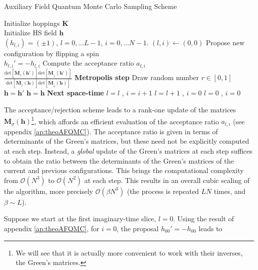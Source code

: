 \begin{algorithm}
\caption{Auxiliary Field Quantum Monte Carlo Sampling Scheme}
\label{afqmcSampling}
\begin{algorithmic}[5]
  \STATE Initialize hoppings $\bm K$  \\
  \STATE Initialize HS field $\bm h$  \\
  \STATE  $(h_{l, i}) = (\pm 1)$, $ l=0,... L-1$, $i = 0, ... N-1$.
  \STATE $(l, i) \leftarrow (0, 0)$
  \STATE \footnotesize{Propose new configuration by flipping a spin} \\ \normalsize{$h_{l, i}' = - h_{l, i}$} 
  \STATE \footnotesize{Compute the acceptance ratio $a_{l, i}$} \\
  \normalsize{$\frac{\text{det}[\bm M_\uparrow (\bm h')]\text{det}[\bm M_\downarrow (\bm h')]}{\text{det}[\bm M_\uparrow (\bm h)]\text{det}[\bm M_\downarrow (\bm h)]}$}
  \STATE \textbf{\normalsize{Metropolis step}}
  \STATE \footnotesize{Draw random number $r \in [0,1]$}
  \STATE $\bm h = \bm h'$
  \ELSE
  \STATE $\bm h = \bm h$
  \ENDIF
  \STATE \textbf{Next space-time }
  \STATE $l = l$ , $i = i +1 $
  \ELSE
  \STATE $l = l+1$ , $i = 0 $
  \ENDIF
  \STATE $l = 0$ , $i=0$
  \ENDIF
  \ENDIF
  \ENDFOR
\end{algorithmic}
\end{algorithm}

The acceptance/rejection scheme leads to a rank-one update of the matrices $\bm M_\sigma (\bm h)$\footnote{We will see that it is actually more convenient to work with their inverses, the Green's matrices.}, which affords an efficient evaluation of the acceptance ratio $a_{l, i}$ \cite{hou_numerical_2009} (see appendix \ref{ap:theoAFQMC}).
The acceptance ratio is given in terms of determinants of the Green's matrices, but these need not be explicitly computed at each step.
Instead, a \emph{global} update of the Green's matrices at each step suffices to obtain the ratio between the determinants of the Green's matrices of the current and previous configurations.
This brings the computational complexity from $\mathcal{O}(N^3)$ to $\mathcal{O}(N^2)$ at each step.
This results in an overall cubic scaling of the algorithm, more precisely $\mathcal{O}(\beta N^3)$ (the process is repeated $L N$ times, and $\beta \sim L$).

Suppose we start at the first imaginary-time slice, $l = 0$.
Using the result of appendix \ref{ap:theoAFQMC}, for $i = 0$, the proposal $h_{0 0}' = - h_{0 0}$ leads to

